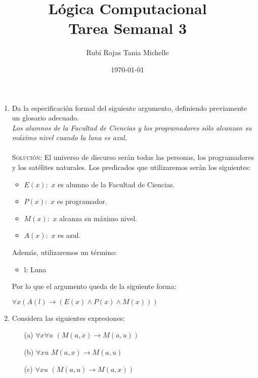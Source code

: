 \documentclass[letterpaper,11pt]{article}
\title{Lógica Computacional \\ Tarea Semanal 3}
\author{Rubí Rojas Tania Michelle}
\date{\today}
\begin{document}
    \maketitle

    \begin{enumerate}

        \item Da la especificación formal del siguiente argumento, definiendo
        previamente un glosario adecuado. \\
        \textit{Los alumnos de la Facultad de Ciencias y los programadores 
        sólo alcanzan su máximo nivel cuando la luna es azul.} \\  \\
        \textsc{Solución:} El universo de discurso serán todas las personas,
        los programadores y los satélites naturales. Los predicados que 
        utilizaremos serán los siguientes:
        \begin{itemize}
            \item $E(x):$ $x$ es alumno de la Facultad de Ciencias.
            \item $P(x):$ $x$ es programador.
            \item $M(x):$ $x$ alcanza su máximo nivel.
            \item $A(x):$ $x$ es azul.
        \end{itemize}

        Además, utilizaremos un término:
        \begin{itemize}
            \item l: Luna
        \end{itemize}

        Por lo que el argumento queda de la siguiente forma:
        \begin{center}
            $\forall x(A(l) \rightarrow (E(x) \land P(x) \land 
            M(x)))$
        \end{center}

        \item Considera las siguientes expresiones:
        \begin{itemize}
            \item[(a)] $\forall x \forall u$ $(M(a,x) \rightarrow M(a,u))$
            \item[(b)] $\forall xu$ $M(a,x) \rightarrow M(a,u)$
            \item[(c)] $\forall xu$ $(M(a,u) \rightarrow M(a,x))$  


\end{itemize}
\end{enumerate}
\end{document}
